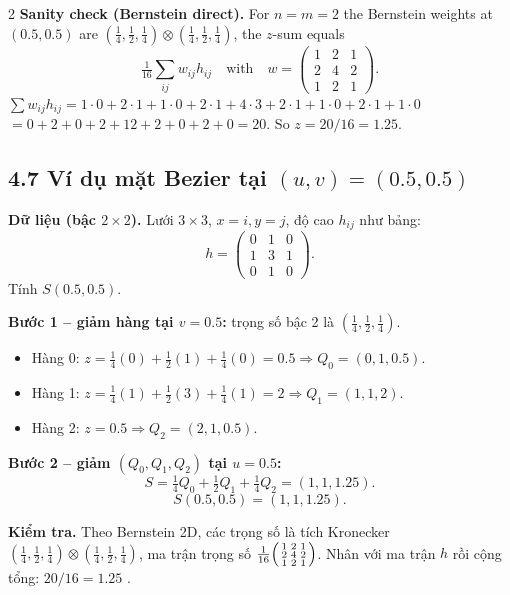 \begin{paracol}{2}
\medskip
\textbf{Sanity check (Bernstein direct).} For $n=m=2$ the Bernstein weights at $(0.5,0.5)$ are $(\tfrac14,\tfrac12,\tfrac14)\otimes(\tfrac14,\tfrac12,\tfrac14)$, the $z$-sum equals
\[
\tfrac{1}{16}\!\sum_{ij}w_{ij}h_{ij}\quad\text{with}\quad w=\begin{pmatrix}1&2&1\\2&4&2\\1&2&1\end{pmatrix}.
\]
$\sum w_{ij}h_{ij}=1\!\cdot\!0+2\!\cdot\!1+1\!\cdot\!0+2\!\cdot\!1+4\!\cdot\!3+2\!\cdot\!1+1\!\cdot\!0+2\!\cdot\!1+1\!\cdot\!0$
$=0+2+0+2+12+2+0+2+0=20$. So $z=20/16=1.25$. \checkmark

\switchcolumn

\subsection*{4.7 Ví dụ mặt Bezier tại $(u,v)=(0.5,0.5)$}

\textbf{Dữ liệu (bậc $2{\times}2$).} Lưới $3\times 3$, $x=i,y=j$, độ cao $h_{ij}$ như bảng:
\[
h=\begin{pmatrix}0&1&0\\1&3&1\\0&1&0\end{pmatrix}.
\]
Tính $S(0.5,0.5)$.

\textbf{Bước 1 -- giảm hàng tại $v=0.5$:}
trọng số bậc 2 là $(\tfrac14,\tfrac12,\tfrac14)$.
\begin{itemize}[leftmargin=*,nosep]
  \item Hàng 0: $z=\tfrac14(0)+\tfrac12(1)+\tfrac14(0)=0.5\Rightarrow Q_0=(0,1,0.5)$.
  \item Hàng 1: $z=\tfrac14(1)+\tfrac12(3)+\tfrac14(1)=2\Rightarrow Q_1=(1,1,2)$.
  \item Hàng 2: $z=0.5\Rightarrow Q_2=(2,1,0.5)$.
\end{itemize}

\textbf{Bước 2 -- giảm $(Q_0,Q_1,Q_2)$ tại $u=0.5$:}
\[
S=\tfrac14 Q_0+\tfrac12 Q_1+\tfrac14 Q_2 = (1,1,1.25).
\]
\[
\boxed{S(0.5,0.5)=(1,1,1.25)}.
\]

\textbf{Kiểm tra.} Theo Bernstein 2D, các trọng số là tích Kronecker
$(\tfrac14,\tfrac12,\tfrac14){\otimes}(\tfrac14,\tfrac12,\tfrac14)$, ma trận trọng số $\frac{1}{16}\begin{psmallmatrix}1&2&1\\2&4&2\\1&2&1\end{psmallmatrix}$. Nhân với ma trận $h$ rồi cộng tổng: $20/16=1.25$ \checkmark.


\end{paracol}
